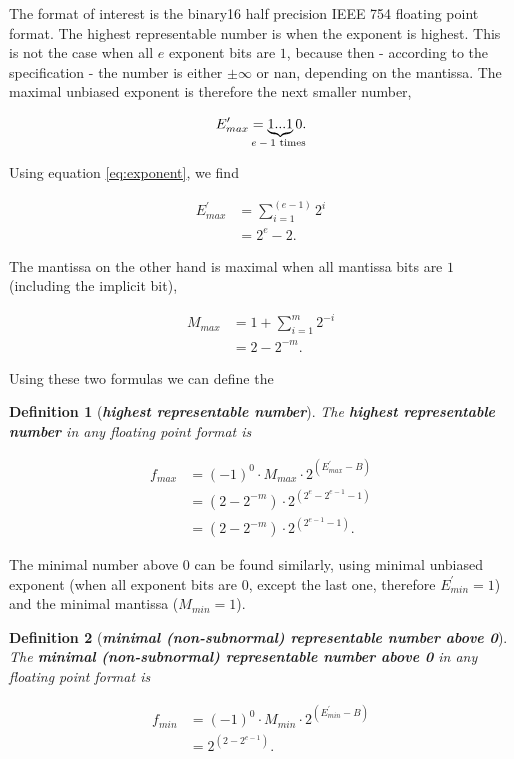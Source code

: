 \documentclass{article}
\theoremstyle{plain} %
\newtheorem{definition}{Definition}[section]
\theoremstyle{remark} %
\def\df#1{\textbf{\textit{#1}}}
\numberwithin{equation}{section}
\begin{document}
The format of interest is the \gls{binary16} half precision IEEE 754 floating point format. The highest representable number is when the exponent is highest. This is not the case when all $e$ exponent bits are $1$, because then - according to the specification \cite{ieee754_1985} - the number is either $\pm \infty$ or \acrfull{nan}, depending on the mantissa. The maximal unbiased exponent is therefore the next smaller number,

\begin{align*}
    E^{\prime}_{max} = \underbrace{ 1...1 }_{\text{\makebox[0pt]{$e-1$ times} }}0.
\end{align*}

Using equation \eqref{eq:exponent}, we find

\begin{align*}
    E^{\prime}_{max} &= \sum_{i=1}^{(e-1)} 2^i \\
            &= 2^e -2.
\end{align*}

The mantissa on the other hand is maximal when all mantissa bits are $1$ (including the implicit bit),

\begin{align*}
    M_{max} &= 1 + \sum_{i=1}^{m} 2^{-i} \\
            &= 2 - 2^{-m}.
\end{align*}

Using these two formulas we can define the

\begin{definition}[\df{highest representable number}]

The \df{highest representable number} in any floating point format is

\begin{align*}
    f_{max} &= (-1)^0 \cdot M_{max} \cdot 2^{(E^{\prime}_{max} - B)} \\
            &= ( 2 - 2^{-m} ) \cdot 2^{(2^e -2^{e-1} -1)} \\
            &= ( 2 - 2^{-m} ) \cdot 2^{(2^{e-1} -1)}.
\end{align*}

\end{definition}

The minimal number above \num{0} can be found similarly, using minimal unbiased exponent (when all exponent bits are \num{0}, except the last one, therefore $E^{\prime}_{min} = 1$) and the minimal mantissa ($M_{min} = 1$).

\begin{definition}[\df{minimal (non-subnormal) representable number above \num{0}}]

The \df{minimal (non-subnormal) representable number above \num{0}} in any floating point format is

\begin{align*}
    f_{min} &= (-1)^0 \cdot M_{min} \cdot 2^{(E^{\prime}_{min} - B)} \\
            &= 2^{(2 - 2^{e-1})}.
\end{align*}

\end{definition}
\end{document}
